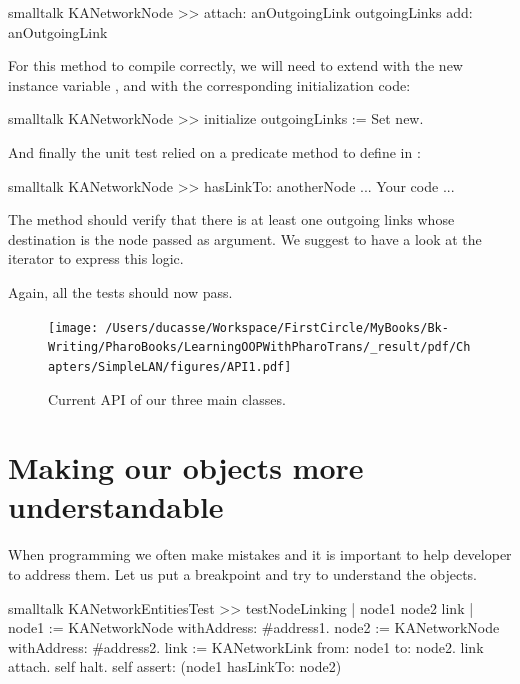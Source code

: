 \documentclass[10pt,twoside,english]{_support/latex/sbabook/sbabook}
\begin{document}
\begin{displaycode}{smalltalk}
KANetworkNode >> attach: anOutgoingLink
    outgoingLinks add: anOutgoingLink
\end{displaycode}

For this method to compile correctly, we will need to extend  with the new instance variable , and with the corresponding initialization code:

\begin{displaycode}{smalltalk}
KANetworkNode >> initialize
    outgoingLinks := Set new.
\end{displaycode}

And finally the unit test relied on a predicate method to define in :

\begin{displaycode}{smalltalk}
KANetworkNode >> hasLinkTo: anotherNode
    ... Your code ...
\end{displaycode}

The method  should verify that there is at least one outgoing links whose destination is the node passed as argument.  We suggest to have a look at the iterator  to express this logic.

Again, all the tests should now pass.


\begin{figure}

\begin{center}
\texttt{[image: /Users/ducasse/Workspace/FirstCircle/MyBooks/Bk-Writing/PharoBooks/LearningOOPWithPharoTrans/\_result/pdf/Chapters/SimpleLAN/figures/API1.pdf]}\caption{Current API of our three main classes.\label{/Users/ducasse/Workspace/FirstCircle/MyBooks/Bk-Writing/PharoBooks/LearningOOPWithPharoTrans/_result/pdf/Chapters/SimpleLAN/figures/API1.pdf}}\end{center}
\end{figure}

\section{Making our objects more understandable}
When programming we often make mistakes and it is important to help developer to address them. Let us put a breakpoint and 
try to understand the objects. 

\begin{displaycode}{smalltalk}
KANetworkEntitiesTest >> testNodeLinking
	| node1 node2 link |
	node1 := KANetworkNode withAddress: #address1.
	node2 := KANetworkNode withAddress: #address2.
	link := KANetworkLink from: node1 to: node2.
	link attach.
	self halt.
	self assert: (node1 hasLinkTo: node2)
\end{displaycode}
\end{document}
